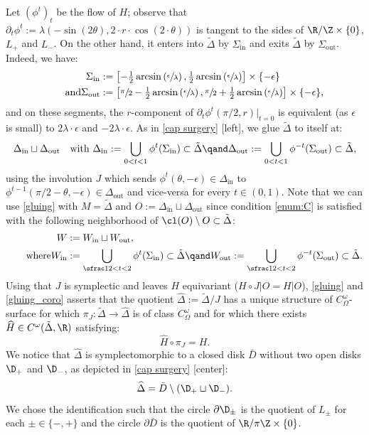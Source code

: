 Let $(\phi^t)_t$ be the flow of $H$; observe that $\partial_t \phi^t:= \lambda(-\sin(2\theta), 2\cdot r\cdot \cos(2\cdot \theta))$ is tangent to the sides of $\R/\Z\times \{0\}$, $L_+$ and $L_-$.
On the other hand, it enters into $\tilde \Delta$ by $\Sigma_\mathrm{in}$ and exits $\tilde \Delta$ by $\Sigma_\mathrm{out}$. Indeed, we have:
\begin{align*}
\Sigma_\mathrm{in}&:= \left[- \tfrac12 \arcsin\left(\sfrac \epsilon\lambda \right),\tfrac12 \arcsin\left(\sfrac \epsilon\lambda \right)\right]\times \{-\epsilon\}\\
\tag*{and}
\Sigma_\mathrm{out}&:= \left[\sfrac\pi2 - \tfrac12 \arcsin\left(\sfrac \epsilon\lambda \right),\sfrac\pi2 +\tfrac12 \arcsin\left(\sfrac \epsilon\lambda \right)\right]\times \{-\epsilon\},
\end{align*}
and on these segments, the $r$-component of $ \partial_t \phi^t(\pi/2, r)|_{t=0}$ is equivalent (as $\epsilon$ is small) to \resp $2\lambda \cdot \epsilon$ and $-2\lambda \cdot \epsilon$.
As in \cref{cap surgery} [left], we glue $\tilde \Delta$ to itself at:
\[
\Delta_\mathrm{in}\sqcup \Delta_\mathrm{out}\quad \text{with }
\Delta_\mathrm{in}:=
\bigcup_{0< t<1} \phi^{t}(\Sigma_\mathrm{in}) \subset \tilde \Delta \qand \Delta_\mathrm{out}
:= \bigcup_{0< t<1} \phi^{-t}(\Sigma_\mathrm{out}) \subset \tilde \Delta,
\]
using the involution $J$ which sends $\phi^{t}(\theta, -\epsilon)\in \Delta_\mathrm{in}$ to $\phi^{t-1}(\pi/2-\theta, -\epsilon)\in \Delta_\mathrm{out}$ and vice-versa for every $t\in (0,1)$. Note that we can use \cref{gluing} with $M=\tilde \Delta$ and $O:= \Delta_\mathrm{in}\sqcup \Delta_\mathrm{out}$ since condition \eqref{enum:C} is satisfied with the following neighborhood of $\cl(O)\setminus O \subset \tilde \Delta$:
\begin{align*}
W&:=W_\mathrm{in}\sqcup W_\mathrm{out},\\
\tag*{where}
W_\mathrm{in}
&:= \bigcup_{\sfrac12 <t<2} \phi^t(\Sigma_\mathrm{in}) \subset \tilde \Delta
\qand
W_\mathrm{out}:= \bigcup_{\sfrac12 <t<2} \phi^{-t}(\Sigma_\mathrm{out})\subset \tilde \Delta.
\end{align*}
Using that $J$ is symplectic and leaves $H$ equivariant ($H\circ J|O= H|O$), \cref{gluing} and \cref{gluing_coro} asserts that the quotient $\widehat \Delta:= \tilde \Delta/J$ has a unique structure of $C^\omega_\Omega$\nobreakdash-surface for which $\pi_J: \tilde \Delta\to \widehat \Delta$ is of class $C^\omega_\Omega$ and for which there exists $\widehat H\in C^\omega(\tilde \Delta, \R)$ satisfying:
\[\widehat H\circ \pi_J= H.\]
We notice that $\widehat \Delta$ is symplectomorphic to a closed disk $\bar D$ without two open disks $\D_+$ and $\D_-$, as depicted in \cref{cap surgery} [center]:
\[\widehat \Delta= \bar D \setminus (\D_+ \sqcup \D_-).\]
We chose the identification such that the circle $\partial \D_\pm $ is the quotient of $L_\pm$ for each $\pm\in\{ -,+\}$ and the circle $\partial \bar D $ is the quotient of $\R/\pi \Z\times \{0\}$.

